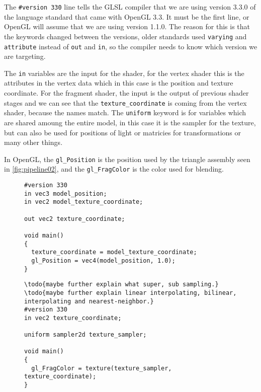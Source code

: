 The \texttt{\#version 330} line tells the \gls{GLSL} compiler that we are using version 3.3.0 of the language standard that came with OpenGL 3.3.
It must be the first line, or OpenGL will assume that we are using version 1.1.0.
The reason for this is that the keywords changed between the versions, older standards used \texttt{varying} and \texttt{attribute} instead of \texttt{out} and \texttt{in}, so the compiler needs to know which version we are targeting.

The \texttt{in} variables are the input for the shader, for the vertex shader this is the attributes in the vertex data which in this case is the position and texture coordinate. 
For the fragment shader, the input is the output of previous shader stages and we can see that the \texttt{texture\_coordinate} is coming from the vertex shader, because the names match.
The \texttt{uniform} keyword is for variables which are shared amoung the entire model, in this case it is the sampler for the texture, but can also be used for positions of light or matricies for transformations or many other things.

In OpenGL, the \texttt{gl\_Position} is the position used by the triangle assembly seen in \cref{fig:pipeline02}, and the \texttt{gl\_FragColor} is the color used for blending.

\begin{figure}[H]
\begin{lstlisting}[caption={This vertex shader takes in a position and a texture coordinate. It parses the position into the standard \texttt{gl\_Position} vector which is used internally by OpenGL. The texture coordinate is parsed through to the output and will be linear interpolated between output from other verticies. (GLSL)},label={lst:pipeline_vertex_shader}]
#version 330
in vec3 model_position;
in vec2 model_texture_coordinate;

out vec2 texture_coordinate;

void main()
{
  texture_coordinate = model_texture_coordinate;
  gl_Position = vec4(model_position, 1.0);
}
\end{lstlisting}
\end{figure}

\begin{figure}[H]
\begin{lstlisting}[caption={This fragment shader takes a linear interpolated texture coordinate and finds the corrosponding color in a texture using a texture sampler. The sampler determine what strategy to use for super- and sub-sampling, popular strategies include linear interpolating, bilinear interpolating and nearest-neighbor. The output is then set to a standard \texttt{gl\_FragColor} vector which is used by OpenGL internally. (GLSL)}, label={lst:pipeline_fragment_shader}]
\todo{maybe further explain what super, sub sampling.}
\todo{maybe further explain linear interpolating, bilinear, interpolating and nearest-neighbor.}
#version 330
in vec2 texture_coordinate;

uniform sampler2d texture_sampler;

void main()
{
  gl_FragColor = texture(texture_sampler, texture_coordinate);
}
\end{lstlisting}
\end{figure}

